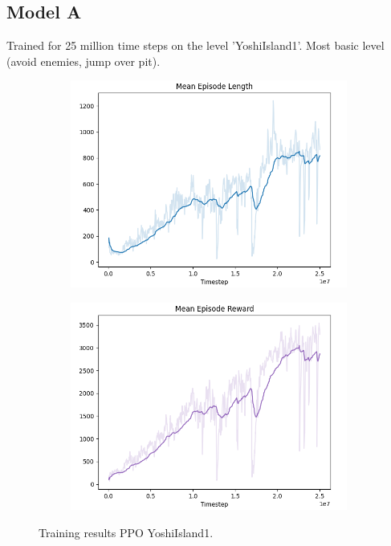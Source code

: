 \documentclass[a4paper]{article}
\begin{document}
\subsection{Model A}
Trained for 25 million time steps on the level 'YoshiIsland1'.
Most basic level (avoid enemies, jump over pit).
\begin{figure}[htbp]
    \centering
    \begin{subfigure}{.5\textwidth}
        \centering
        \includegraphics[width=\textwidth]{PPO_YoshiIsland1_len}
        \label{fig:result1:sub1}
    \end{subfigure}%
    \begin{subfigure}{.5\textwidth}
        \centering
        \includegraphics[width=\textwidth]{PPO_YoshiIsland1_rew}
        \label{fig:result1:sub2}
    \end{subfigure}
    \caption{Training results PPO YoshiIsland1.}
    \label{fig:result1}
\end{figure}
\end{document}
